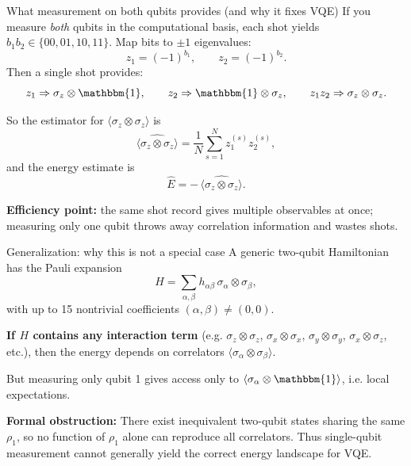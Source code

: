 \documentclass[aspectratio=169]{beamer}
\newcommand{\Z}{\sigma_z}
\newcommand{\X}{\sigma_x}
\newcommand{\Y}{\sigma_y}
\newcommand{\I}{\mathbbm{1}}
\begin{document}
\begin{frame}{What measurement on both qubits provides (and why it fixes VQE)}
If you measure \emph{both} qubits in the computational basis, each shot yields \(b_1b_2\in\{00,01,10,11\}\).
Map bits to \(\pm 1\) eigenvalues:
\[
z_1=(-1)^{b_1},\qquad z_2=(-1)^{b_2}.
\]
Then a single shot provides:
\[
z_1 \Rightarrow \Z\otimes\I,\qquad
z_2 \Rightarrow \I\otimes\Z,\qquad
z_1z_2 \Rightarrow \Z\otimes\Z.
\]

\medskip
So the estimator for \(\langle \Z\otimes\Z\rangle\) is
\[
\widehat{\langle \Z\otimes\Z\rangle}=\frac{1}{N}\sum_{s=1}^N z_1^{(s)}z_2^{(s)},
\]
and the energy estimate is
\[
\hat{E} = -\,\widehat{\langle \Z\otimes\Z\rangle}.
\]

\medskip
\textbf{Efficiency point:} the same shot record gives multiple observables at once; measuring only one qubit throws away correlation information and wastes shots.
\end{frame}

\begin{frame}{Generalization: why this is not a special case}
A generic two-qubit Hamiltonian has the Pauli expansion
\[
H=\sum_{\alpha,\beta} h_{\alpha\beta}\,\sigma_\alpha\otimes\sigma_\beta,
\]
with up to 15 nontrivial coefficients \((\alpha,\beta)\neq (0,0)\).

\medskip
\textbf{If \(H\) contains any interaction term} (e.g. \(\Z\otimes\Z\), \(\X\otimes\X\), \(\Y\otimes\Y\), \(\X\otimes\Z\), etc.),
then the energy depends on correlators \(\langle \sigma_\alpha\otimes\sigma_\beta\rangle\).

\medskip
But measuring only qubit 1 gives access only to \(\langle \sigma_\alpha\otimes \I\rangle\), i.e. local expectations.

\medskip
\textbf{Formal obstruction:} There exist inequivalent two-qubit states sharing the same \(\rho_1\),
so no function of \(\rho_1\) alone can reproduce all correlators.
Thus single-qubit measurement cannot generally yield the correct energy landscape for VQE.
\end{frame}
\end{document}
